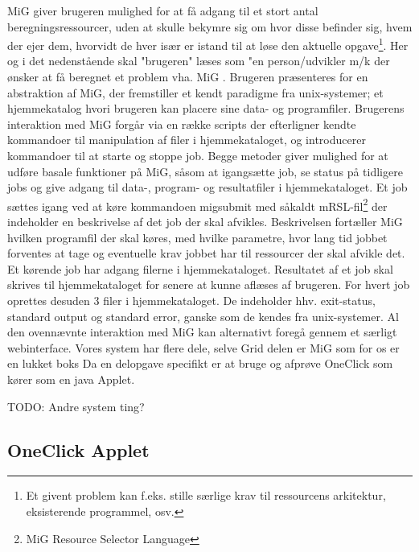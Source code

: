 \documentclass[final,a4paper,10pt]{article}
\begin{document}
MiG giver brugeren mulighed for at få adgang til et stort antal beregningsressourcer, uden at skulle bekymre sig om hvor disse befinder sig, hvem der ejer dem, hvorvidt de hver især er istand til at løse den aktuelle opgave\footnote{Et givent problem kan f.eks. stille særlige krav til ressourcens arkitektur, eksisterende programmel, osv. }. Her og i det nedenstående skal "brugeren" læses som "en person/udvikler m/k der ønsker at få beregnet et problem vha. MiG . Brugeren præsenteres for en abstraktion af MiG, der fremstiller et kendt paradigme fra unix-systemer; et hjemmekatalog hvori brugeren kan placere sine data- og programfiler. Brugerens interaktion med MiG forgår via en række scripts der efterligner kendte kommandoer til manipulation af filer i hjemmekataloget, og introducerer kommandoer til at starte og stoppe job. Begge metoder giver mulighed for at udføre basale funktioner på MiG, såsom at igangsætte job, se status på tidligere jobs og give adgang til data-, program- og resultatfiler i hjemmekataloget. Et job sættes igang ved at køre kommandoen migsubmit med såkaldt mRSL-fil\footnote{MiG Resource Selector Language} der indeholder en beskrivelse af det job der skal afvikles. Beskrivelsen fortæller MiG hvilken programfil der skal køres, med hvilke parametre, hvor lang tid jobbet forventes at tage og eventuelle krav jobbet har til ressourcer der skal afvikle det. Et kørende job har adgang filerne i  hjemmekataloget. Resultatet af et job skal skrives til hjemmekataloget for senere at kunne aflæses af brugeren. For hvert job oprettes desuden 3 filer i hjemmekataloget. De indeholder hhv. exit-status, standard output og standard error, ganske som de kendes fra unix-systemer. 
Al den ovennævnte interaktion med MiG kan alternativt foregå gennem et særligt webinterface. 
Vores system har flere dele, selve Grid delen er MiG som for os er en lukket boks
Da en delopgave specifikt er at bruge og afprøve OneClick som kører som en java Applet.

TODO: Andre system ting?

\subsection{OneClick Applet}\label{applet}
\end{document}
